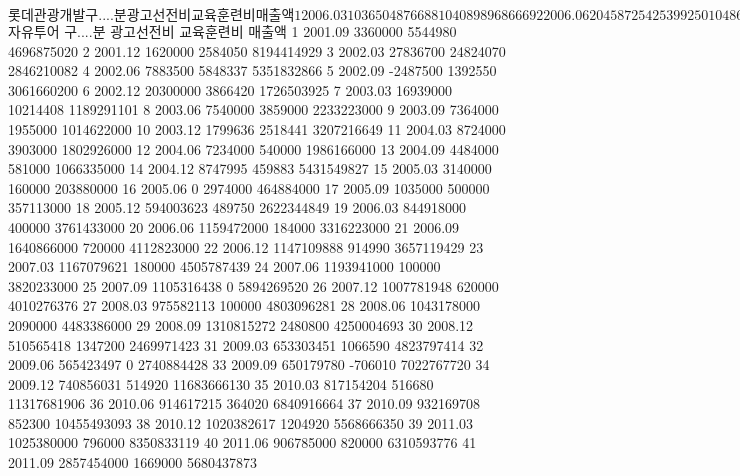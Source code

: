\begin{Schunk}
\begin{Soutput}
$롯데관광개발
   구....분 광고선전비 교육훈련비      매출액
1   2006.03 1036504876    6881040  8989686669
2   2006.06 2045872542    5399250 10486867068
3   2006.09 2739658080   15348250 14941497865
4   2006.12 1254813126   21589250 12175786065
5   2007.03 1195205643   27700180 12366948305
6   2007.06 1309156992   26722010 11500679409
7   2007.09 1062194930   32002591 16877064858
8   2007.12  986694351   19226091 10845317936
9   2008.03  977711617   23188682 12954724212
10  2008.06  984506080   24090040 11001911869
11  2008.09 1158096243   36495000 10797072664
12  2008.12  486885406   25375633  6545406791
13  2009.03  477624164   19607350  5582468824
14  2009.06  569612024   20698260  7088618820
15  2009.09  600097366   28783950  7726065331
16  2009.12  546760303   18322830  5515137791
17  2010.03  660158348   28187000  7761111255
18  2010.06  613649450   17553344  8633822363
19  2010.09  609214711   30269450 12561340891
20  2010.12  665034444   18269420  9821126136
21  2011.03  607102000          0  9707491187
22  2011.06  670256000   58419000 11048769593
23  2011.09  796352000   27963000 13488179269

$자유투어
   구....분 광고선전비 교육훈련비      매출액
1   2001.09    3360000    5544980  4696875020
2   2001.12    1620000    2584050  8194414929
3   2002.03   27836700   24824070  2846210082
4   2002.06    7883500    5848337  5351832866
5   2002.09   -2487500    1392550  3061660200
6   2002.12   20300000    3866420  1726503925
7   2003.03   16939000   10214408  1189291101
8   2003.06    7540000    3859000  2233223000
9   2003.09    7364000    1955000  1014622000
10  2003.12    1799636    2518441  3207216649
11  2004.03    8724000    3903000  1802926000
12  2004.06    7234000     540000  1986166000
13  2004.09    4484000     581000  1066335000
14  2004.12    8747995     459883  5431549827
15  2005.03    3140000     160000   203880000
16  2005.06          0    2974000   464884000
17  2005.09    1035000     500000   357113000
18  2005.12  594003623     489750  2622344849
19  2006.03  844918000     400000  3761433000
20  2006.06 1159472000     184000  3316223000
21  2006.09 1640866000     720000  4112823000
22  2006.12 1147109888     914990  3657119429
23  2007.03 1167079621     180000  4505787439
24  2007.06 1193941000     100000  3820233000
25  2007.09 1105316438          0  5894269520
26  2007.12 1007781948     620000  4010276376
27  2008.03  975582113     100000  4803096281
28  2008.06 1043178000    2090000  4483386000
29  2008.09 1310815272    2480800  4250004693
30  2008.12  510565418    1347200  2469971423
31  2009.03  653303451    1066590  4823797414
32  2009.06  565423497          0  2740884428
33  2009.09  650179780    -706010  7022767720
34  2009.12  740856031     514920 11683666130
35  2010.03  817154204     516680 11317681906
36  2010.06  914617215     364020  6840916664
37  2010.09  932169708     852300 10455493093
38  2010.12 1020382617    1204920  5568666350
39  2011.03 1025380000     796000  8350833119
40  2011.06  906785000     820000  6310593776
41  2011.09 2857454000    1669000  5680437873


\end{Soutput}
\end{Schunk}
